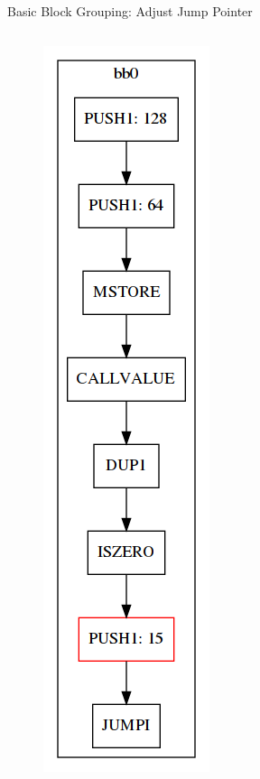 \documentclass[11pt]{beamer}
\begin{document}
\begin{frame}{Basic Block Grouping: Adjust Jump Pointer}
\begin{columns}
{\begin{figure}
        \includegraphics[scale=0.25]{figures/stack/cfg_stack7.png}
    \end{figure}
}
\end{columns}
\end{frame}
\end{document}
